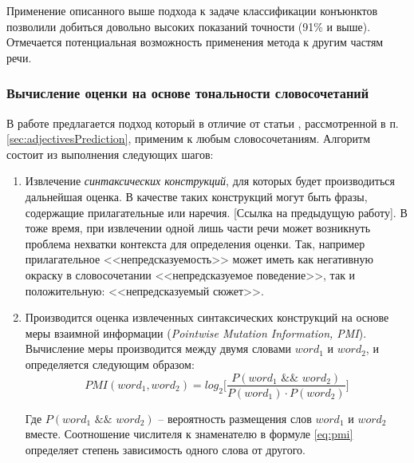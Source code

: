         Применение описанного выше подхода к задаче классификации конъюнктов
        позволили добиться довольно высоких показаний точности (91\% и выше).
        Отмечается потенциальная возможность применения метода к другим
        частям речи.

        \subsubsection{Вычисление оценки на основе тональности словосочетаний}
        \label{sec:soEvaluation}
        В работе \cite{lexiconSO} предлагается подход который в отличие от
        статьи \cite{lexiconAdjectives}, рассмотренной в п. \ref{sec:adjectivesPrediction},
        применим к любым словосочетаниям. Алгоритм состоит из выполнения следующих шагов:
        \begin{enumerate}
            \item Извлечение {\it синтаксических конструкций}, для которых будет производиться
                дальнейшая оценка. В качестве таких конструкций могут быть фразы, содержащие
                прилагательные или наречия. [Ссылка на предыдущую работу]. В тоже время,
                при извлечении одной лишь части речи может возникнуть проблема нехватки контекста
                для определения оценки. Так, например прилагательное <<непредсказуемость>>
                может иметь как негативную окраску в словосочетании <<непредсказуемое поведение>>,
                так и положительную: <<непредсказуемый сюжет>>.
            \item Производится оценка извлеченных синтаксических конструкций на основе
                меры взаимной информации ({\it Pointwise Mutation Information, PMI}).
                Вычисление меры производится между двумя словами $word_1$ и $word_2$,
                и определяется следующим образом:
                \begin{equation}
                    \label{eq:pmi}
                    PMI(word_1, word_2) = log_2 \Bigg[ \dfrac{P(word_1 \hspace{4pt} \&\& \hspace{4pt} word_2)}{P(word_1) \cdot P(word_2)} \Bigg]
                \end{equation}

                Где $P(word_1 \hspace{4pt} \&\& \hspace{4pt} word_2)$ -- вероятность
                размещения слов $word_1$ и $word_2$ вместе. Соотношение числителя
                к знаменателю в формуле \ref{eq:pmi} определяет степень зависимость одного
                слова от другого.


\end{enumerate}
